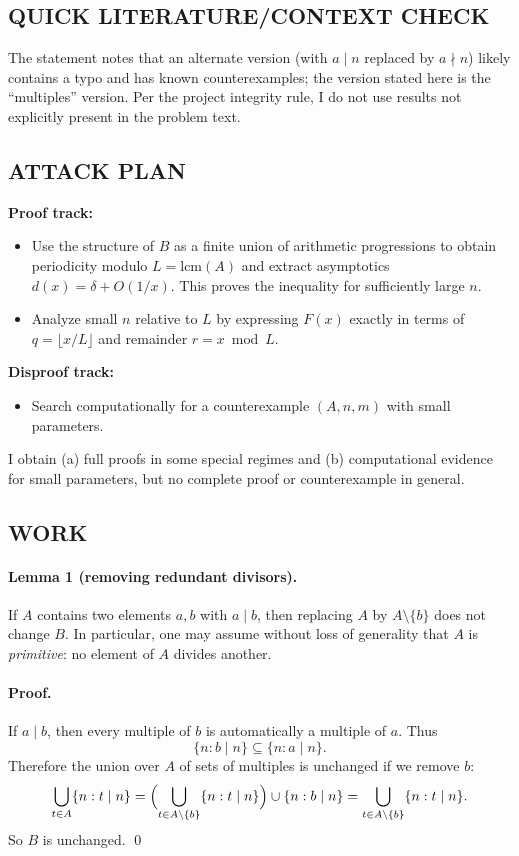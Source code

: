 \subsection*{QUICK LITERATURE/CONTEXT CHECK}
The statement notes that an alternate version (with $a\mid n$ replaced by $a\nmid n$) likely contains a typo and has known counterexamples; the version stated here is the ``multiples'' version.
Per the project integrity rule, I do not use results not explicitly present in the problem text.

\subsection*{ATTACK PLAN}
\textbf{Proof track:}
\begin{itemize}
\item Use the structure of $B$ as a finite union of arithmetic progressions to obtain periodicity modulo $L=\mathrm{lcm}(A)$ and extract asymptotics $d(x)=\delta+O(1/x)$. This proves the inequality for sufficiently large $n$.
\item Analyze small $n$ relative to $L$ by expressing $F(x)$ exactly in terms of $q=\lfloor x/L\rfloor$ and remainder $r=x\bmod L$.
\end{itemize}
\textbf{Disproof track:}
\begin{itemize}
\item Search computationally for a counterexample $(A,n,m)$ with small parameters.
\end{itemize}
I obtain (a) full proofs in some special regimes and (b) computational evidence for small parameters, but no complete proof or counterexample in general.

\subsection*{WORK}
\paragraph{Lemma 1 (removing redundant divisors).}
If $A$ contains two elements $a,b$ with $a\mid b$, then replacing $A$ by $A\setminus\{b\}$ does not change $B$.
In particular, one may assume without loss of generality that $A$ is \emph{primitive}: no element of $A$ divides another.

\paragraph{Proof.}
If $a\mid b$, then every multiple of $b$ is automatically a multiple of $a$. Thus
\[\{n: b\mid n\}\subseteq\{n: a\mid n\}.
\]
Therefore the union over $A$ of sets of multiples is unchanged if we remove $b$:
\[
\bigcup_{t\in A}\{n: t\mid n\}=\Bigl(\bigcup_{t\in A\setminus\{b\}}\{n: t\mid n\}\Bigr)\cup\{n: b\mid n\}=\bigcup_{t\in A\setminus\{b\}}\{n: t\mid n\}.
\]
So $B$ is unchanged.
\qed

